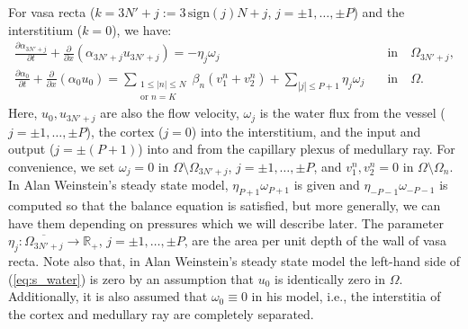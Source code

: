 \documentclass{article}
\begin{document}
For vasa recta ($k=3N'+j:=3\,\mathrm{sign}(j)N+j$, $j=\pm 1,\dots,\pm P$) and the interstitium ($k=0$), we have:
\begin{align}
    \frac{\partial \alpha_{3N'+j}}{\partial t} + \frac{\partial}{\partial x}(\alpha_{3N'+j}u_{3N'+j}) = -\eta_{j}\omega_{j}\qquad &\text{in}\quad \Omega_{3N'+j},\\
    \frac{\partial \alpha_0}{\partial t} + \frac{\partial}{\partial x}(\alpha_0u_0) = 
        \sum_{\substack{1\leq|n|\leq N\\\text{or } n=K}}\beta_n(v_{1}^n+v_{2}^n)+\sum_{|j|\leq P+1}\eta_j\omega_j \quad &\text{in}\quad \Omega.\label{eq:s_water}
\end{align}
Here, $u_0,u_{3N'+j}$ are also the flow velocity, $\omega_j$ is the water flux from the vessel ($j=\pm 1,\dots,\pm P$), the cortex ($j=0$) into the interstitium, and the input and output ($j=\pm(P+1)$) into and from the capillary plexus of medullary ray.
For convenience, we set $\omega_j = 0$ in $\Omega\setminus \Omega_{3N'+j}$, $j=\pm 1,\dots,\pm P$, and $v_1^n,v_2^n=0$ in $\Omega\setminus\Omega_n$.
In Alan Weinstein's steady state model, $\eta_{P+1}\omega_{P+1}$ is given and $\eta_{-P-1}\omega_{-P-1}$ is computed so that the balance equation is satisfied, but more generally, we can have them depending on pressures which we will describe later.
The parameter $\eta_j:\overline{\Omega_{3N'+j}}\to\mathbb{R}_+$, $j=\pm 1,\dots,\pm P$, are the area per unit depth of the wall of vasa recta.
Note also that, in Alan Weinstein's steady state model 
the left-hand side of (\ref{eq:s_water}) is zero by an assumption that $u_0$ is identically zero in $\Omega$.
Additionally, it is also assumed that $\omega_0\equiv 0$ in his model, i.e., the interstitia of the cortex and medullary ray are completely separated.

\end{document}
